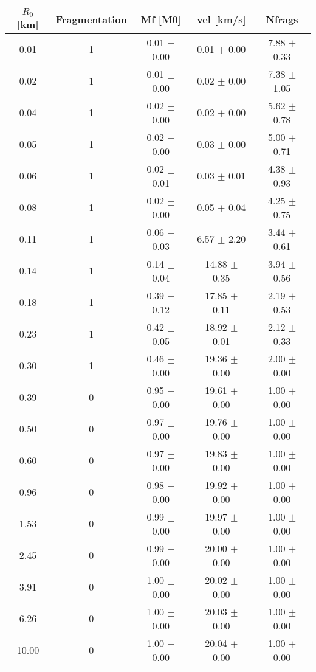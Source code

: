\begin{tabular}{|c||c||c||c||c|}
\toprule
$R_0$ [km] & Fragmentation & Mf [M0] & vel [km/s] & Nfrags \\
\midrule
0.01 & 1 & 0.01 $\pm$ 0.00 & 0.01 $\pm$ 0.00 & 7.88 $\pm$ 0.33 \\
0.02 & 1 & 0.01 $\pm$ 0.00 & 0.02 $\pm$ 0.00 & 7.38 $\pm$ 1.05 \\
0.04 & 1 & 0.02 $\pm$ 0.00 & 0.02 $\pm$ 0.00 & 5.62 $\pm$ 0.78 \\
0.05 & 1 & 0.02 $\pm$ 0.00 & 0.03 $\pm$ 0.00 & 5.00 $\pm$ 0.71 \\
0.06 & 1 & 0.02 $\pm$ 0.01 & 0.03 $\pm$ 0.01 & 4.38 $\pm$ 0.93 \\
0.08 & 1 & 0.02 $\pm$ 0.00 & 0.05 $\pm$ 0.04 & 4.25 $\pm$ 0.75 \\
0.11 & 1 & 0.06 $\pm$ 0.03 & 6.57 $\pm$ 2.20 & 3.44 $\pm$ 0.61 \\
0.14 & 1 & 0.14 $\pm$ 0.04 & 14.88 $\pm$ 0.35 & 3.94 $\pm$ 0.56 \\
0.18 & 1 & 0.39 $\pm$ 0.12 & 17.85 $\pm$ 0.11 & 2.19 $\pm$ 0.53 \\
0.23 & 1 & 0.42 $\pm$ 0.05 & 18.92 $\pm$ 0.01 & 2.12 $\pm$ 0.33 \\
0.30 & 1 & 0.46 $\pm$ 0.00 & 19.36 $\pm$ 0.00 & 2.00 $\pm$ 0.00 \\
0.39 & 0 & 0.95 $\pm$ 0.00 & 19.61 $\pm$ 0.00 & 1.00 $\pm$ 0.00 \\
0.50 & 0 & 0.97 $\pm$ 0.00 & 19.76 $\pm$ 0.00 & 1.00 $\pm$ 0.00 \\
0.60 & 0 & 0.97 $\pm$ 0.00 & 19.83 $\pm$ 0.00 & 1.00 $\pm$ 0.00 \\
0.96 & 0 & 0.98 $\pm$ 0.00 & 19.92 $\pm$ 0.00 & 1.00 $\pm$ 0.00 \\
1.53 & 0 & 0.99 $\pm$ 0.00 & 19.97 $\pm$ 0.00 & 1.00 $\pm$ 0.00 \\
2.45 & 0 & 0.99 $\pm$ 0.00 & 20.00 $\pm$ 0.00 & 1.00 $\pm$ 0.00 \\
3.91 & 0 & 1.00 $\pm$ 0.00 & 20.02 $\pm$ 0.00 & 1.00 $\pm$ 0.00 \\
6.26 & 0 & 1.00 $\pm$ 0.00 & 20.03 $\pm$ 0.00 & 1.00 $\pm$ 0.00 \\
10.00 & 0 & 1.00 $\pm$ 0.00 & 20.04 $\pm$ 0.00 & 1.00 $\pm$ 0.00 \\
\bottomrule
\end{tabular}
